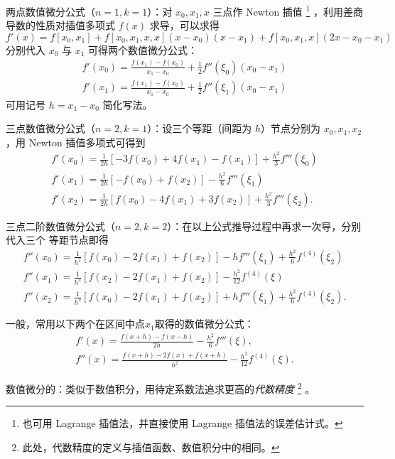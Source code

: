 \entry 两点数值微分公式（$n=1,k=1$）：对 $x_0,x_1,x$ 三点作 Newton 插值
\footnote{也可用 Lagrange 插值法，并直接使用 Lagrange 插值法的误差估计式。}
，利用差商导数的性质对插值多项式 $f(x)$ 求导，可以求得
\[ f'(x)=f[x_0,x_1] + f[x_0,x_1,x,x](x-x_0)(x-x_1)+ f[x_0,x_1,x](2x-x_0-x_1) \]
分别代入 $x_0$ 与 $x_1$ 可得两个数值微分公式：
\begin{gather}
f'(x_0)=\frac{f(x_1)-f(x_0)}{x_1-x_0}+\frac12f''(\xi_0)(x_0-x_1)\label{7-e3}\\
f'(x_1)=\frac{f(x_1)-f(x_0)}{x_1-x_0}+\frac12f''(\xi_1)(x_0-x_1)\label{7-e4}
\end{gather}
可用记号 $h=x_1-x_0$ 简化写法。

\entry 三点数值微分公式（$n=2,k=1$）：设三个等距（间距为 $h$）节点分别为 $x_0,x_1,x_2$，用 Newton 插值多项式可得到
\begin{gather}
f'(x_0)=\frac1{2h}[-3f(x_0)+4f(x_1)-f(x_1)]+\frac{h^2}3f'''(\xi_0)\\
f'(x_1)=\frac1{2h}[-f(x_0)+f(x_2)]-\frac{h^2}6f'''(\xi_1)\\
f'(x_2)=\frac1{2h}[f(x_0)-4f(x_1)+3f(x_2)]+\frac{h^2}3f'''(\xi_2).
\end{gather}

\entry 三点二阶数值微分公式（$n=2,k=2$）：在以上公式推导过程中再求一次导，分别代入三个
等距节点即得 
\begin{gather}
f''(x_0)=\frac1{h^2}[f(x_0)-2f(x_1)+f(x_2)]-hf'''(\xi_1)+\frac{h^2}6f^{(4)}(\xi_2)\\
f''(x_1)=\frac1{h^2}[f(x_2)-2f(x_1)+f(x_2)]-\frac{h^2}{12}f^{(4)}(\xi)
\label{7-e-mid}\\
f''(x_2)=\frac1{h^2}[f(x_0)-2f(x_1)+f(x_2)]+hf'''(\xi_1)+\frac{h^2}6f^{(4)}(\xi_2).
\end{gather}

\entry 一般，常用以下两个在区间中点$x_1$取得的数值微分公式：
\begin{gather}
f'(x)=\frac{f(x+h)-f(x-h)}{2h}-\frac{h^2}6f'''(\xi),\\
f''(x)=\frac{f(x+h)-2f(x)+f(x+h)}{h^2}-\frac{h^2}{12}f^{(4)}(\xi).
\end{gather}

\entry 数值微分的：类似于数值积分，用待定系数法追求更高的\emph{代数精度}
\footnote{此处，代数精度的定义与插值函数、数值积分中的相同。}
。

